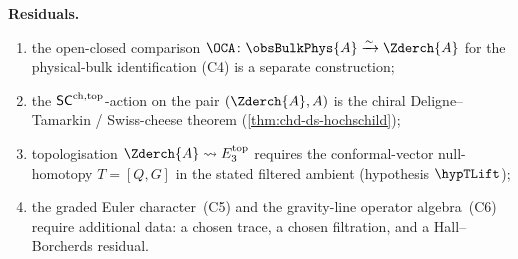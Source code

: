 \begin{theorem}
\noindent\textbf{Residuals.}\enspace
\begin{enumerate}[label=\textup{(R\arabic*)}]
\item the open-closed comparison $\OCA \colon \obsBulkPhys{A}
\xrightarrow{\sim} \Zderch{A}$ for the physical-bulk identification
\textup{(C4)} is a separate construction;
\item the $\mathsf{SC}^{\mathrm{ch},\mathrm{top}}$-action on the pair $(\Zderch{A}, A)$ is the
chiral Deligne--Tamarkin / Swiss-cheese theorem
(\cref{thm:chd-ds-hochschild});
\item topologisation $\Zderch{A} \rightsquigarrow E_{3}^{\mathrm{top}}$
requires the conformal-vector null-homotopy $T = [Q, G]$ in the stated
filtered ambient (hypothesis $\hypTLift$);
\item the graded Euler character~\textup{(C5)} and the gravity-line
operator algebra~\textup{(C6)} require additional data: a chosen trace,
a chosen filtration, and a Hall--Borcherds residual.
\end{enumerate}
\end{theorem}

